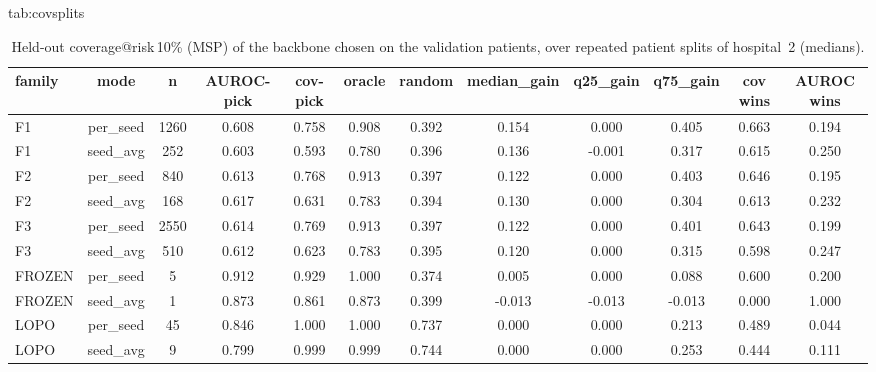 \begin{table}[t]
\floatconts
  {tab:covsplits}
  {\caption{Held-out coverage@risk\,10\% (MSP) of the backbone chosen on the validation patients, over repeated patient splits of hospital~2 (medians).}}
  {\small
  \begin{tabular}{@{}lccccccccccc@{}}
  \toprule
  family & mode & n & AUROC-pick & cov-pick & oracle & random & median\_gain & q25\_gain & q75\_gain & cov wins & AUROC wins \\
  \midrule
  F1 & per\_seed & 1260 & 0.608 & 0.758 & 0.908 & 0.392 & 0.154 & 0.000 & 0.405 & 0.663 & 0.194 \\
  F1 & seed\_avg & 252 & 0.603 & 0.593 & 0.780 & 0.396 & 0.136 & -0.001 & 0.317 & 0.615 & 0.250 \\
  F2 & per\_seed & 840 & 0.613 & 0.768 & 0.913 & 0.397 & 0.122 & 0.000 & 0.403 & 0.646 & 0.195 \\
  F2 & seed\_avg & 168 & 0.617 & 0.631 & 0.783 & 0.394 & 0.130 & 0.000 & 0.304 & 0.613 & 0.232 \\
  F3 & per\_seed & 2550 & 0.614 & 0.769 & 0.913 & 0.397 & 0.122 & 0.000 & 0.401 & 0.643 & 0.199 \\
  F3 & seed\_avg & 510 & 0.612 & 0.623 & 0.783 & 0.395 & 0.120 & 0.000 & 0.315 & 0.598 & 0.247 \\
  FROZEN & per\_seed & 5 & 0.912 & 0.929 & 1.000 & 0.374 & 0.005 & 0.000 & 0.088 & 0.600 & 0.200 \\
  FROZEN & seed\_avg & 1 & 0.873 & 0.861 & 0.873 & 0.399 & -0.013 & -0.013 & -0.013 & 0.000 & 1.000 \\
  LOPO & per\_seed & 45 & 0.846 & 1.000 & 1.000 & 0.737 & 0.000 & 0.000 & 0.213 & 0.489 & 0.044 \\
  LOPO & seed\_avg & 9 & 0.799 & 0.999 & 0.999 & 0.744 & 0.000 & 0.000 & 0.253 & 0.444 & 0.111 \\
  \bottomrule
  \end{tabular}}
\end{table}
